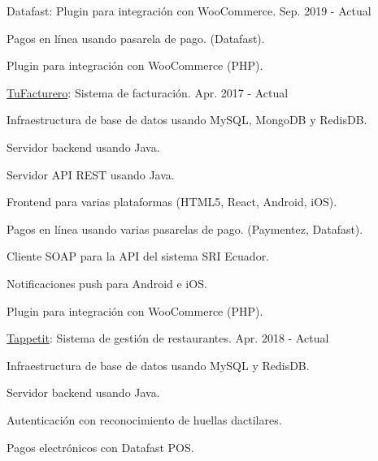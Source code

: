 \begin{cventries}
  \cventry
    {Datafast: Plugin para integración con WooCommerce.} %
    {} %
    {} %
    {Sep. 2019 - Actual} %
    {
      \begin{cvitems} %
        \item {Pagos en línea usando pasarela de pago. (Datafast).}
        \item {Plugin para integración con WooCommerce (PHP).}
      \end{cvitems}
    }

  \cventry
    {\href{https://tufacturero.ec}{TuFacturero}: Sistema de facturación.} %
    {} %
    {} %
    {Apr. 2017 - Actual} %
    {
      \begin{cvitems} %
        \item {Infraestructura de base de datos usando MySQL, MongoDB y RedisDB.}
        \item {Servidor backend usando Java.}
        \item {Servidor API REST usando Java.}
        \item {Frontend para varias plataformas (HTML5, React, Android, iOS).}
        \item {Pagos en línea usando varias pasarelas de pago. (Paymentez, Datafast).}
        \item {Cliente SOAP para la API del sistema SRI Ecuador.}
        \item {Notificaciones push para Android e iOS.}
        \item {Plugin para integración con WooCommerce (PHP).}
      \end{cvitems}
    }

  \cventry
    {\href{https://tappetit.com}{Tappetit}: Sistema de gestión de restaurantes.} %
    {} %
    {} %
    {Apr. 2018 - Actual} %
    {
      \begin{cvitems} %
        \item {Infraestructura de base de datos usando MySQL y RedisDB.}
        \item {Servidor backend usando Java.}
        \item {Autenticación con reconocimiento de huellas dactilares.}
        \item {Pagos electrónicos con Datafast POS.}
      \end{cvitems}
    }


\end{cventries}
